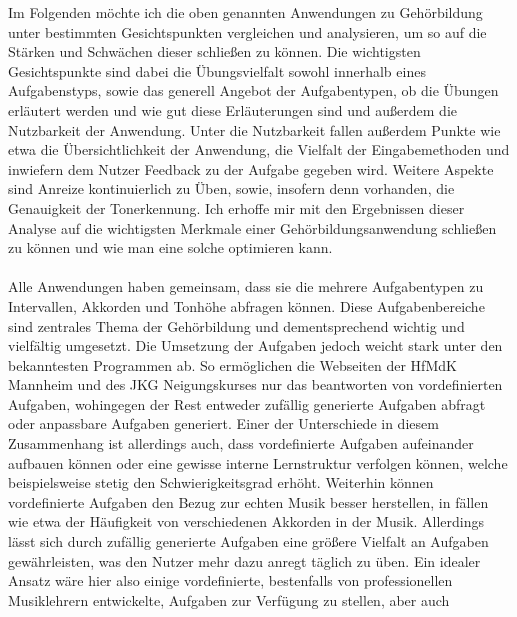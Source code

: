 %

Im Folgenden möchte ich die oben genannten Anwendungen zu Gehörbildung unter bestimmten Gesichtspunkten vergleichen und analysieren, um so auf die Stärken und Schwächen dieser schließen zu können. Die wichtigsten Gesichtspunkte sind dabei
die Übungsvielfalt sowohl innerhalb eines Aufgabenstyps, sowie das generell Angebot der Aufgabentypen, ob die Übungen erläutert werden und wie gut diese Erläuterungen sind und außerdem die Nutzbarkeit der Anwendung. Unter die Nutzbarkeit fallen 
außerdem Punkte wie etwa die Übersichtlichkeit der Anwendung, die Vielfalt der Eingabemethoden und inwiefern dem Nutzer Feedback zu der Aufgabe gegeben wird. Weitere Aspekte sind Anreize kontinuierlich zu Üben, sowie, insofern denn vorhanden, die Genauigkeit der Tonerkennung.
Ich erhoffe mir mit den Ergebnissen dieser Analyse auf die wichtigsten Merkmale einer Gehörbildungsanwendung schließen zu können und wie man eine solche optimieren kann. \\\\
Alle Anwendungen haben gemeinsam, dass sie die mehrere Aufgabentypen zu Intervallen, Akkorden und Tonhöhe abfragen können. Diese Aufgabenbereiche sind zentrales Thema der Gehörbildung und dementsprechend wichtig und vielfältig umgesetzt. 
Die Umsetzung der Aufgaben jedoch weicht stark unter den bekanntesten Programmen ab. So ermöglichen die Webseiten der HfMdK Mannheim und des JKG Neigungskurses nur das beantworten von vordefinierten Aufgaben, wohingegen der Rest entweder zufällig generierte Aufgaben abfragt oder anpassbare Aufgaben generiert.
Einer der Unterschiede in diesem Zusammenhang ist allerdings auch, dass vordefinierte Aufgaben aufeinander aufbauen können oder eine gewisse interne Lernstruktur verfolgen können, welche beispielsweise stetig den Schwierigkeitsgrad erhöht. Weiterhin können vordefinierte Aufgaben den Bezug zur echten Musik besser herstellen, in fällen wie etwa
der Häufigkeit von verschiedenen Akkorden in der Musik. Allerdings lässt sich durch zufällig generierte Aufgaben eine größere Vielfalt an Aufgaben gewährleisten, was den Nutzer mehr dazu anregt täglich zu üben. Ein idealer Ansatz wäre hier also einige vordefinierte, bestenfalls von professionellen Musiklehrern entwickelte, Aufgaben zur Verfügung zu stellen, aber auch
